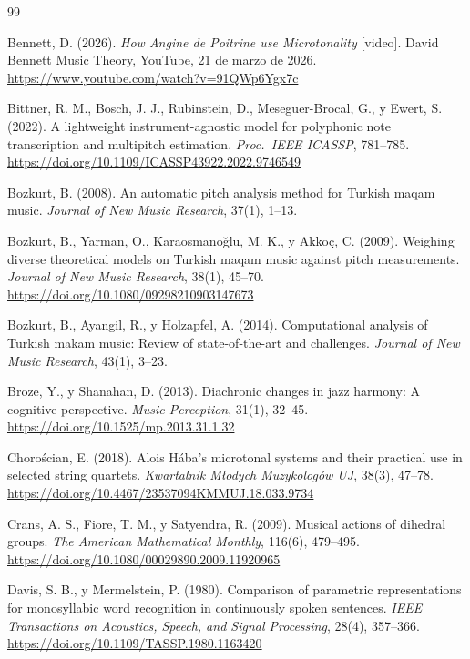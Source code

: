 \begin{thebibliography}{99}

Bennett, D. (2026). \emph{How Angine de Poitrine use Microtonality} [video]. David Bennett Music Theory, YouTube,
21 de marzo de 2026. \url{https://www.youtube.com/watch?v=91QWp6Ygx7c}

Bittner, R. M., Bosch, J. J., Rubinstein, D., Meseguer-Brocal, G., y Ewert, S. (2022). A lightweight
instrument-agnostic model for polyphonic note transcription and multipitch estimation. \emph{Proc.\ IEEE ICASSP},
781--785. \url{https://doi.org/10.1109/ICASSP43922.2022.9746549}

Bozkurt, B. (2008). An automatic pitch analysis method for Turkish maqam music. \emph{Journal of New Music Research},
37(1), 1--13.

Bozkurt, B., Yarman, O., Karaosmanoğlu, M. K., y Akkoç, C. (2009). Weighing diverse theoretical models on Turkish maqam
music against pitch measurements. \emph{Journal of New Music Research}, 38(1), 45--70.
\url{https://doi.org/10.1080/09298210903147673}

Bozkurt, B., Ayangil, R., y Holzapfel, A. (2014). Computational analysis of Turkish makam music: Review of
state-of-the-art and challenges. \emph{Journal of New Music Research}, 43(1), 3--23.

Broze, Y., y Shanahan, D. (2013). Diachronic changes in jazz harmony: A cognitive perspective. \emph{Music Perception},
31(1), 32--45. \url{https://doi.org/10.1525/mp.2013.31.1.32}

Chorościan, E. (2018). Alois Hába's microtonal systems and their practical use in selected string quartets.
\emph{Kwartalnik Młodych Muzykologów UJ}, 38(3), 47--78. \url{https://doi.org/10.4467/23537094KMMUJ.18.033.9734}

Crans, A. S., Fiore, T. M., y Satyendra, R. (2009). Musical actions of dihedral groups. \emph{The American Mathematical
Monthly}, 116(6), 479--495. \url{https://doi.org/10.1080/00029890.2009.11920965}

Davis, S. B., y Mermelstein, P. (1980). Comparison of parametric representations for monosyllabic word recognition in
continuously spoken sentences. \emph{IEEE Transactions on Acoustics, Speech, and Signal Processing}, 28(4), 357--366.
\url{https://doi.org/10.1109/TASSP.1980.1163420}


\end{thebibliography}
